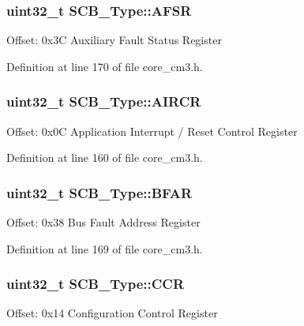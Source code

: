 \subsubsection[{\texorpdfstring{A\+F\+SR}{AFSR}}]{ {\bf uint32\+\_\+t} S\+C\+B\+\_\+\+Type\+::\+A\+F\+SR}\hypertarget{struct_s_c_b___type_aeb77053c84f49c261ab5b8374e8958ef}{}\label{struct_s_c_b___type_aeb77053c84f49c261ab5b8374e8958ef}
Offset\+: 0x3C Auxiliary Fault Status Register 

Definition at line 170 of file core\+\_\+cm3.\+h.

\subsubsection[{\texorpdfstring{A\+I\+R\+CR}{AIRCR}}]{ {\bf uint32\+\_\+t} S\+C\+B\+\_\+\+Type\+::\+A\+I\+R\+CR}\hypertarget{struct_s_c_b___type_a6ed3c9064013343ea9fd0a73a734f29d}{}\label{struct_s_c_b___type_a6ed3c9064013343ea9fd0a73a734f29d}
Offset\+: 0x0C Application Interrupt / Reset Control Register 

Definition at line 160 of file core\+\_\+cm3.\+h.

\subsubsection[{\texorpdfstring{B\+F\+AR}{BFAR}}]{ {\bf uint32\+\_\+t} S\+C\+B\+\_\+\+Type\+::\+B\+F\+AR}\hypertarget{struct_s_c_b___type_a31f79afe86c949c9862e7d5fce077c3a}{}\label{struct_s_c_b___type_a31f79afe86c949c9862e7d5fce077c3a}
Offset\+: 0x38 Bus Fault Address Register 

Definition at line 169 of file core\+\_\+cm3.\+h.

\subsubsection[{\texorpdfstring{C\+CR}{CCR}}]{ {\bf uint32\+\_\+t} S\+C\+B\+\_\+\+Type\+::\+C\+CR}\hypertarget{struct_s_c_b___type_a6d273c6b90bad15c91dfbbad0f6e92d8}{}\label{struct_s_c_b___type_a6d273c6b90bad15c91dfbbad0f6e92d8}
Offset\+: 0x14 Configuration Control Register 

